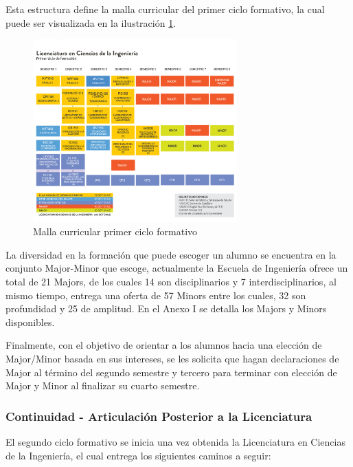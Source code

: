 Esta estructura define la malla curricular del primer ciclo formativo, la cual puede ser visualizada en la ilustración \ref{fig:bachelor_study_plan}.

\begin{figure}
	\begin{center}
  \includegraphics[width=0.7\textwidth]{./figures/malla_curricular.png}
  \caption{Malla curricular primer ciclo formativo}
  \label{fig:bachelor_study_plan}
	\end{center}
\end{figure}

La diversidad en la formación que puede escoger un alumno se encuentra en la conjunto Major-Minor que escoge, actualmente la Escuela de Ingeniería ofrece un total de 21 Majors, de los cuales 14 son disciplinarios y 7 interdisciplinarios, al mismo tiempo, entrega una oferta de 57 Minors entre los cuales, 32 son profundidad y 25 de amplitud. En el Anexo I se detalla los Majors y Minors disponibles.

Finalmente, con el objetivo de orientar a los alumnos hacia una elección de Major/Minor basada en sus intereses, se les solicita que hagan declaraciones de Major al término del segundo semestre y tercero para terminar con elección de Major y Minor al finalizar su cuarto semestre.

\subsubsection{Continuidad - Articulación Posterior a la Licenciatura \label{sec:degree_structure}}

El segundo ciclo formativo se inicia una vez obtenida la Licenciatura en Ciencias de la Ingeniería, el cual entrega los siguientes caminos a seguir:


